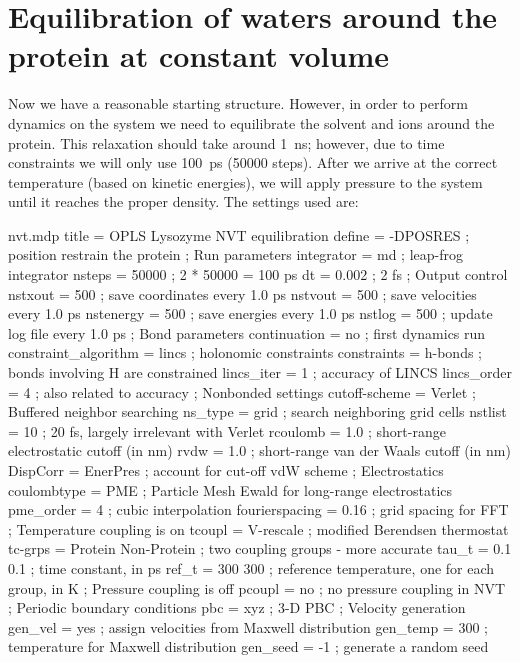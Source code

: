 \documentclass[10pt]{article}
\begin{document}
\section{Equilibration of waters around the protein at constant volume}

Now we have a reasonable starting structure. However, in order to perform dynamics on the system we need to equilibrate the solvent and ions around the protein. This relaxation should take around 1~ns; however, due to time constraints we will only use 100~ps (50000 steps). After we arrive at the correct temperature (based on kinetic energies), we will apply pressure to the system until it reaches the proper density. The settings used are:

\begin{script}{nvt.mdp}
title                   = OPLS Lysozyme NVT equilibration 
define                  = -DPOSRES  ; position restrain the protein
; Run parameters
integrator              = md        ; leap-frog integrator
nsteps                  = 50000     ; 2 * 50000 = 100 ps
dt                      = 0.002     ; 2 fs
; Output control
nstxout                 = 500       ; save coordinates every 1.0 ps
nstvout                 = 500       ; save velocities every 1.0 ps
nstenergy               = 500       ; save energies every 1.0 ps
nstlog                  = 500       ; update log file every 1.0 ps
; Bond parameters
continuation            = no        ; first dynamics run
constraint_algorithm    = lincs     ; holonomic constraints 
constraints             = h-bonds   ; bonds involving H are constrained
lincs_iter              = 1         ; accuracy of LINCS
lincs_order             = 4         ; also related to accuracy
; Nonbonded settings 
cutoff-scheme           = Verlet    ; Buffered neighbor searching
ns_type                 = grid      ; search neighboring grid cells
nstlist                 = 10        ; 20 fs, largely irrelevant with Verlet
rcoulomb                = 1.0       ; short-range electrostatic cutoff (in nm)
rvdw                    = 1.0       ; short-range van der Waals cutoff (in nm)
DispCorr                = EnerPres  ; account for cut-off vdW scheme
; Electrostatics
coulombtype             = PME       ; Particle Mesh Ewald for long-range electrostatics
pme_order               = 4         ; cubic interpolation
fourierspacing          = 0.16      ; grid spacing for FFT
; Temperature coupling is on
tcoupl                  = V-rescale             ; modified Berendsen thermostat
tc-grps                 = Protein Non-Protein   ; two coupling groups - more accurate
tau_t                   = 0.1     0.1           ; time constant, in ps
ref_t                   = 300     300           ; reference temperature, one for each group, in K
; Pressure coupling is off
pcoupl                  = no        ; no pressure coupling in NVT
; Periodic boundary conditions
pbc                     = xyz       ; 3-D PBC
; Velocity generation
gen_vel                 = yes       ; assign velocities from Maxwell distribution
gen_temp                = 300       ; temperature for Maxwell distribution
gen_seed                = -1        ; generate a random seed
\end{script}
\end{document}

